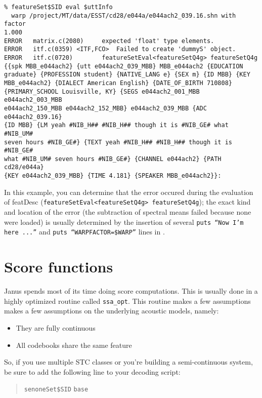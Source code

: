 \begin{verbatim}
% featureSet$SID eval $uttInfo
  warp /project/MT/data/ESST/cd28/e044a/e044ach2_039.16.shn with factor 
1.000
ERROR   matrix.c(2080)     expected 'float' type elements.
ERROR   itf.c(0359) <ITF,FCO>  Failed to create 'dummyS' object.
ERROR   itf.c(0720)        featureSetEval<featureSetQ4g> featureSetQ4g 
{{spk MBB_e044ach2} {utt e044ach2_039_MBB} MBB_e044ach2 {EDUCATION 
graduate} {PROFESSION student} {NATIVE_LANG e} {SEX m} {ID MBB} {KEY 
MBB_e044ach2} {DIALECT American English} {DATE_OF_BIRTH 710808} 
{PRIMARY_SCHOOL Louisville, KY} {SEGS e044ach2_001_MBB e044ach2_003_MBB 
e044ach2_150_MBB e044ach2_152_MBB} e044ach2_039_MBB {ADC e044ach2_039.16} 
{ID MBB} {LM yeah #NIB_H## #NIB_H## though it is #NIB_GE# what #NIB_UM# 
seven hours #NIB_GE#} {TEXT yeah #NIB_H## #NIB_H## though it is #NIB_GE# 
what #NIB_UM# seven hours #NIB_GE#} {CHANNEL e044ach2} {PATH cd28/e044a} 
{KEY e044ach2_039_MBB} {TIME 4.181} {SPEAKER MBB_e044ach2}}:
\end{verbatim}

In this  example, you can determine that  the error occured during the
evaluation       of   featDesc  (\texttt{featureSetEval<featureSetQ4g>
featureSetQ4g}); the    exact kind and   location  of  the  error (the
subtraction  of  spectral means failed  because  none  were loaded) is
usually determined by the insertion of  several \texttt{puts ``Now I'm
here    ...''}  and    \texttt{puts  ``WARPFACTOR=\$WARP''} lines   in
.


\section{Score functions} \label{trouble:scoreA}

Janus spends most of its time doing score computations. This is
usually done in a highly optimized routine called \texttt{ssa\_opt}.
This routine makes a few assumptions makes a few assumptions on
the underlying acoustic models, namely:

\begin{itemize}
\item They are fully continuous
\item All codebooks share the same feature
\end{itemize}

So, if you use multiple STC classes or you're building a semi-continuous
system, be sure to add the following line to your decoding script:

\begin{quote}
\texttt{senoneSet\$SID}  \texttt{base}
\end{quote}

